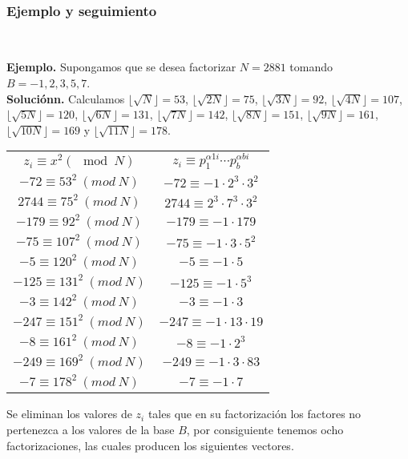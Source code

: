 \documentclass[11pt, conference]{IEEEtran}
\begin{document}
\

\subsubsection[Ejemplo y seguimiento]{\textbf{Ejemplo y seguimiento}}

\

\textbf{Ejemplo.} Supongamos que se desea factorizar $N = 2881$ tomando $B = {-1, 2, 3, 5, 7}$.\\
\textbf{Soluciónn. } Calculamos 
$\lfloor \sqrt{N}\rfloor = 53$,
$\lfloor \sqrt{2N}\rfloor = 75$, 
$\lfloor \sqrt{3N}\rfloor = 92$,
$\lfloor \sqrt{4N}\rfloor = 107$,
$\lfloor \sqrt{5N}\rfloor = 120$,
$\lfloor \sqrt{6N}\rfloor = 131$,
$\lfloor \sqrt{7N}\rfloor = 142$,
$\lfloor \sqrt{8N}\rfloor = 151$,
$\lfloor \sqrt{9N}\rfloor = 161$,
$\lfloor \sqrt{10N}\rfloor = 169$ y 
$\lfloor \sqrt{11N}\rfloor = 178$.
\begin{table}[htb]
	\begin{center}
		\begin{tabular}{c|c}
			 $z_i\equiv x^2 (\mod N)$&
			 $z_i\equiv p_1^{\alpha1i}\cdots p_b^{\alpha b i}$\\
			 $-72\equiv53^2\ (mod\ N)$&
			 $-72\equiv-1\cdot2^3\cdot3^2$\\
			 $2744\equiv75^2\ (mod\ N)$&
			 $2744\equiv2^3\cdot7^3\cdot3^2$\\
			 $-179\equiv92^2\ (mod\ N)$&
			 $-179\equiv-1\cdot179$\\
			 $-75\equiv107^2\ (mod\ N)$&
			 $-75\equiv-1\cdot3\cdot5^2$\\
			 $-5\equiv120^2\ (mod\ N)$&
			 $-5\equiv-1\cdot5$\\
			 $-125\equiv131^2\ (mod\ N)$&
			 $-125\equiv-1\cdot5^3$\\
			 $-3\equiv142^2\ (mod\ N)$&
			 $-3\equiv-1\cdot3$\\
			 $-247\equiv151^2\ (mod\ N)$&
			 $-247\equiv-1\cdot13\cdot19$\\
			 $-8\equiv161^2\ (mod\ N)$&
			 $-8\equiv-1\cdot2^3$\\
			 $-249\equiv169^2\ (mod\ N)$&
			 $-249\equiv-1\cdot3\cdot83$\\
			 $-7\equiv178^2\ (mod\ N)$&
			 $-7\equiv-1\cdot7$\\
		\end{tabular}
	\end{center}
\end{table}
Se eliminan los valores de $z_i$ tales que en su factorización los factores no pertenezca a los valores de la base $B$, por consiguiente tenemos ocho factorizaciones, las cuales producen los siguientes vectores.
\end{document}
